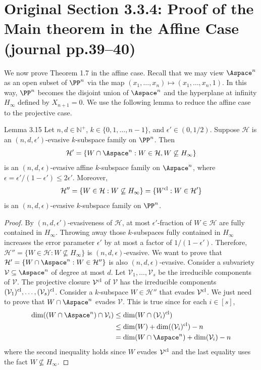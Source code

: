 \section*{Original Section 3.3.4: Proof of the Main theorem in the Affine Case (journal pp.39--40)}
We now prove Theorem 1.7 in the affine case. Recall that we may view $\Aspace^n$ as an open subset of $\PP^n$ via the map $(x_1,\ldots,x_n)\mapsto(x_1,\ldots,x_n,1)$. In this way, $\PP^n$ becomes the disjoint union of $\Aspace^n$ and the hyperplane at infinity $H_\infty$ defined by $X_{n+1}=0$.
We use the following lemma to reduce the affine case to the projective case.
\begin{result}{Lemma 3.15}
Let $n,d\in\mathbb N^+$, $k\in\{0,1,\ldots,n-1\}$, and $\epsilon'\in(0,1/2)$. Suppose $\mathcal H$ is an $(n,d,\epsilon')$-evasive $k$-subspace family on $\PP^n$. Then
\[\mathcal H'=\{W\cap\Aspace^n:W\in\mathcal H,W\not\subseteq H_\infty\}\]
is an $(n,d,\epsilon)$-evasive affine $k$-subspace family on $\Aspace^n$, where $\epsilon=\epsilon'/(1-\epsilon')\le2\epsilon'$. Moreover,
\[\mathcal H''=\{W\in\mathcal H:W\not\subseteq H_\infty\}=\{W^{\rm cl}:W\in\mathcal H'\}\]
is an $(n,d,\epsilon)$-evasive $k$-subspace family on $\PP^n$.
\end{result}
\begin{proof}
By $(n,d,\epsilon')$-evasiveness of $\mathcal H$, at most $\epsilon'$-fraction of $W\in\mathcal H$ are fully contained in $H_\infty$. Throwing away those $k$-subspaces fully contained in $H_\infty$ increases the error parameter $\epsilon'$ by at most a factor of $1/(1-\epsilon')$. Therefore, $\mathcal H''=\{W\in\mathcal H:W\not\subseteq H_\infty\}$ is $(n,d,\epsilon)$-evasive. We want to prove that $\mathcal H'=\{W\cap\Aspace^n:W\in\mathcal H''\}$ is also $(n,d,\epsilon)$-evasive.
Consider a subvariety $\mathcal V\subseteq\Aspace^n$ of degree at most $d$. Let $\mathcal V_1,\ldots,\mathcal V_s$ be the irreducible components of $\mathcal V$. The projective closure $\mathcal V^{\rm cl}$ of $\mathcal V$ has the irreducible components $(\mathcal V_1)^{\rm cl},\ldots,(\mathcal V_s)^{\rm cl}$. Consider a $k$-subspace $W\in\mathcal H''$ that evades $\mathcal V^{\rm cl}$. We just need to prove that $W\cap\Aspace^n$ evades $\mathcal V$. This is true since for each $i\in[s]$,
\begin{align*}
\dim((W\cap\Aspace^n)\cap\mathcal V_i)&\le\dim(W\cap(\mathcal V_i)^{\rm cl})\\
&\le\dim(W)+\dim((\mathcal V_i)^{\rm cl})-n\\
&=\dim(W\cap\Aspace^n)+\dim(\mathcal V_i)-n
\end{align*}
where the second inequality holds since $W$ evades $\mathcal V^{\rm cl}$ and the last equality uses the fact $W\not\subseteq H_\infty$.
\end{proof}
